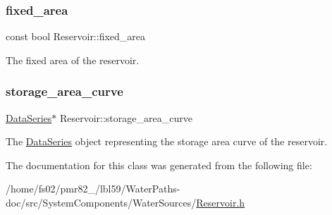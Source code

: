 \mbox{\label{classReservoir_ad4b37aef4873071d1766baaccce5b8cf}} 
\subsubsection{\texorpdfstring{fixed\+\_\+area}{fixed\_area}}
{\footnotesize\ttfamily const bool Reservoir\+::fixed\+\_\+area}



The fixed area of the reservoir. 

\mbox{\label{classReservoir_a46bd5b750963dfa9a57b247fd77ab8ff}} 
\subsubsection{\texorpdfstring{storage\+\_\+area\+\_\+curve}{storage\_area\_curve}}
{\footnotesize\ttfamily \mbox{\hyperlink{classDataSeries}{Data\+Series}}$\ast$ Reservoir\+::storage\+\_\+area\+\_\+curve\hspace{0.3cm}{\ttfamily [protected]}}



The \mbox{\hyperlink{classDataSeries}{Data\+Series}} object representing the storage area curve of the reservoir. 



The documentation for this class was generated from the following file\+:\begin{DoxyCompactItemize}
\item 
/home/fs02/pmr82\+\_/lbl59/\+Water\+Paths-\/doc/src/\+System\+Components/\+Water\+Sources/\mbox{\hyperlink{Reservoir_8h}{Reservoir.\+h}}\end{DoxyCompactItemize}
